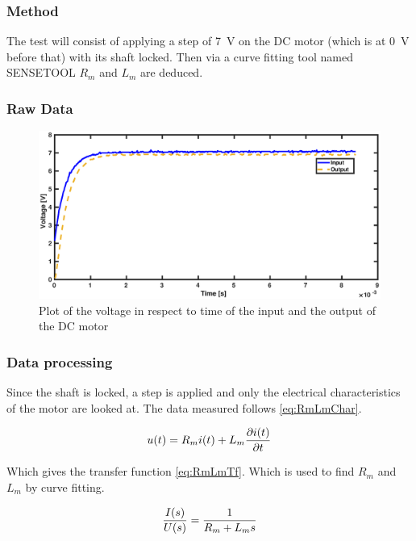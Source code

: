 \subsubsection*{Method}
The test will consist of applying a step of \SI{7}{\volt} on the DC motor (which is at \SI{0}{\volt} before that) with its shaft locked. Then via a curve fitting tool named SENSETOOL $R_m$ and $L_m$ are deduced.

\subsubsection*{Raw Data}

\begin{figure}[htbp]
	\centering
	\includegraphics[width=\textwidth]{figures/appendix/Motor&GearTests/RmLmDataPlot}
	\caption{Plot of the voltage in respect to time of the input and the output of the DC motor}\label{fig:RmLmTestDataPlot}
\end{figure}

\subsubsection*{Data processing}

Since the shaft is locked, a step is applied and only the electrical characteristics of the motor are looked at. The data measured follows \autoref{eq:RmLmChar}.

\begin{equation}\label{eq:RmLmChar}
	u(t)=R_m i(t)+L_m \frac{\partial i(t)}{\partial t} \addunit{\volt}
\end{equation}

Which gives the transfer function \autoref{eq:RmLmTf}. Which is used to find $R_m$ and $L_m$ by curve fitting.

\begin{equation}\label{eq:RmLmTf}
\frac{I(s)}{U(s)}=\frac{1}{R_m +L_m s} \addunit{1}
\end{equation}

